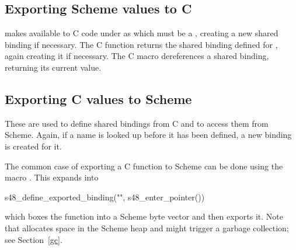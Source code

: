 \subsection{Exporting Scheme values to C}

\begin{protos}
\end{protos}

\begin{protos}
\end{protos}

\noindent{} makes  available to C code
 under as  which must be a , creating a new shared
 binding if necessary.
The C function  returns the shared binding
 defined for , again creating it if necessary.
The C macro  dereferences a shared binding,
 returning its current value.

\subsection{Exporting C values to Scheme}

\begin{protos}
\end{protos}

\begin{protos}
\end{protos}

\noindent These are used to define shared bindings from C and to access them
 from Scheme.
Again, if a name is looked up before it has been defined, a new binding is
 created for it.

The common case of exporting a C function to Scheme can be done using
 the macro .
This expands into
\begin{example}
s48\_define\_exported\_binding("",
                               s48\_enter\_pointer())
\end{example}

\noindent which boxes the function into a Scheme byte vector and then
 exports it.
Note that  allocates space in the Scheme heap
 and might trigger a 
garbage collection; see Section~\ref{gc}.

